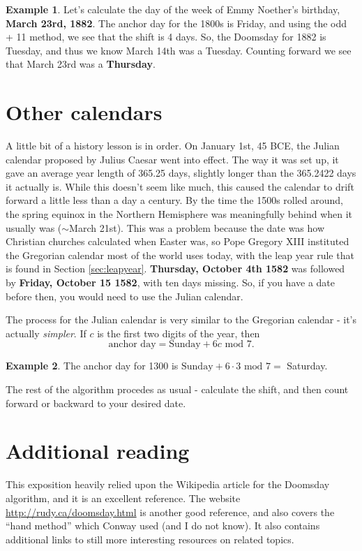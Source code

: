 \documentclass[12pt,letterpaper]{article}
\theoremstyle{plain}
\theoremstyle{definition}
\newtheorem{example}{Example}
\begin{document}
\begin{example}
	Let's calculate the day of the week of Emmy Noether's birthday, \textbf{March 23rd, 1882}. The anchor day for the 1800s is Friday, and using the odd + 11 method, we see that the shift is 4 days. So, the Doomsday for 1882 is Tuesday, and thus we know March 14th was a Tuesday. Counting forward we see that March 23rd was a \textbf{Thursday}.
\end{example}

\section{Other calendars}\label{sec:non-gregorian}

A little bit of a history lesson is in order. On January 1st, 45 BCE, the Julian calendar proposed by Julius Caesar went into effect. The way it was set up, it gave an average year length of 365.25 days, slightly longer than the 365.2422 days it actually is. While this doesn't seem like much, this caused the calendar to drift forward a little less than a day a century. By the time the 1500s rolled around, the spring equinox in the Northern Hemisphere was meaningfully behind when it usually was (\(\sim\)March 21st). This was a problem because the date was how Christian churches calculated when Easter was, so Pope Gregory XIII instituted the Gregorian calendar most of the world uses today, with the leap year rule that is found in Section \ref{sec:leapyear}. \textbf{Thursday, October 4th 1582} was followed by \textbf{Friday, October 15 1582}, with ten days missing. So, if you have a date before then, you would need to use the Julian calendar. 

The process for the Julian calendar is very similar to the Gregorian calendar - it's actually \textit{simpler}. If \(c\) is the first two digits of the year, then 
\[\text{anchor day}=\text{Sunday}+6c\text{ mod } 7.\]
\begin{example}
	The anchor day for 1300 is \(\text{Sunday}+ 6\cdot 3\text{ mod } 7=\) Saturday. 
\end{example}
The rest of the algorithm procedes as usual - calculate the shift, and then count forward or backward to your desired date. 

\section{Additional reading}
This exposition heavily relied upon the Wikipedia article for the Doomsday algorithm, and it is an excellent reference. The website \url{http://rudy.ca/doomsday.html} is another good reference, and also covers the ``hand method'' which Conway used (and I do not know). It also contains additional links to still more interesting resources on related topics. 
\end{document}
